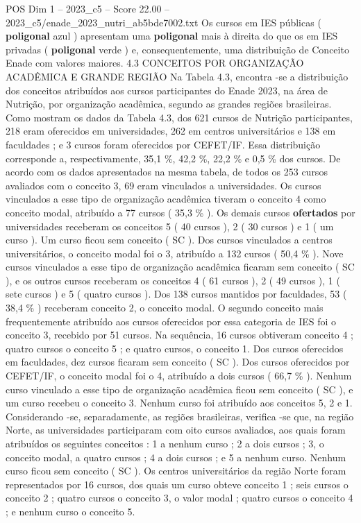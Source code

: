 \begin{textsample}{POS Dim 1 – 2023\_c5 – Score 22.00 – 2023\_c5/enade\_2023\_nutri\_ab5bde7002.txt}
Os cursos em IES públicas ( \textbf{poligonal} azul ) apresentam uma \textbf{poligonal} mais à direita do que os em IES privadas ( \textbf{poligonal} verde ) e, consequentemente, uma distribuição de Conceito Enade com valores maiores. 4.3 CONCEITOS POR ORGANIZAÇÃO ACADÊMICA E GRANDE REGIÃO Na Tabela 4.3, encontra -se a distribuição dos conceitos atribuídos aos cursos participantes do Enade 2023, na área de Nutrição, por organização acadêmica, segundo as grandes regiões brasileiras.
Como mostram os dados da Tabela 4.3, dos 621 cursos de Nutrição participantes, 218 eram oferecidos em universidades, 262 em centros universitários e 138 em faculdades ; e 3 cursos foram oferecidos por CEFET/IF.
Essa distribuição corresponde a, respectivamente, 35,1 \%, 42,2 \%, 22,2 \% e 0,5 \% dos cursos.
De acordo com os dados apresentados na mesma tabela, de todos os 253 cursos avaliados com o conceito 3, 69 eram vinculados a universidades.
Os cursos vinculados a esse tipo de organização acadêmica tiveram o conceito 4 como conceito modal, atribuído a 77 cursos ( 35,3 \% ).
Os demais cursos \textbf{ofertados} por universidades receberam os conceitos 5 ( 40 cursos ), 2 ( 30 cursos ) e 1 ( um curso ).
Um curso ficou sem conceito ( SC ).
Dos cursos vinculados a centros universitários, o conceito modal foi o 3, atribuído a 132 cursos ( 50,4 \% ).
Nove cursos vinculados a esse tipo de organização acadêmica ficaram sem conceito ( SC ), e os outros cursos receberam os conceitos 4 ( 61 cursos ), 2 ( 49 cursos ), 1 ( sete cursos ) e 5 ( quatro cursos ).
Dos 138 cursos mantidos por faculdades, 53 ( 38,4 \% ) receberam conceito 2, o conceito modal.
O segundo conceito mais frequentemente atribuído aos cursos oferecidos por essa categoria de IES foi o conceito 3, recebido por 51 cursos.
Na sequência, 16 cursos obtiveram conceito 4 ; quatro cursos o conceito 5 ; e quatro cursos, o conceito 1.
Dos cursos oferecidos em faculdades, dez cursos ficaram sem conceito ( SC ).
Dos cursos oferecidos por CEFET/IF, o conceito modal foi o 4, atribuído a dois cursos ( 66,7 \% ).
Nenhum curso vinculado a esse tipo de organização acadêmica ficou sem conceito ( SC ), e um curso recebeu o conceito 3.
Nenhum curso foi atribuído aos conceitos 5, 2 e 1.
Considerando -se, separadamente, as regiões brasileiras, verifica -se que, na região Norte, as universidades participaram com oito cursos avaliados, aos quais foram atribuídos os seguintes conceitos : 1 a nenhum curso ; 2 a dois cursos ; 3, o conceito modal, a quatro cursos ; 4 a dois cursos ; e 5 a nenhum curso.
Nenhum curso ficou sem conceito ( SC ).
Os centros universitários da região Norte foram representados por 16 cursos, dos quais um curso obteve conceito 1 ; seis cursos o conceito 2 ; quatro cursos o conceito 3, o valor modal ; quatro cursos o conceito 4 ; e nenhum curso o conceito 5.

\end{textsample}
